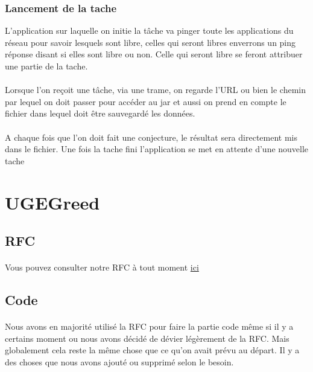 \documentclass[a4paper,titlepage]{report}
\begin{document}
\subsubsection{Lancement de la tache}
L'application sur laquelle on initie la tâche va pinger toute les applications du réseau pour savoir lesquels sont libre, celles qui seront libres enverrons un ping réponse disant si elles sont libre ou non. Celle qui seront libre se feront attribuer une partie de la tache.
\paragraph{}
Lorsque l'on reçoit une tâche, via une trame, on regarde l'URL ou bien le chemin par lequel on doit passer pour accéder au jar  et aussi on prend en compte le fichier dans lequel doit être sauvegardé les données. 
\paragraph{}
A chaque fois que l'on doit fait une conjecture, le résultat sera directement mis dans le fichier. Une fois la tache fini l'application se met en attente d'une nouvelle tache
\pagebreak







\section{UGEGreed}
\subsection{RFC}
\paragraph{}
Vous pouvez consulter notre RFC à tout moment
\href {https://gitlab.com/Setsulys/ugegreed-debats-ly-ieng/-/blob/main/GreedRfc.md}{ici}
\subsection{Code}
\paragraph{}
Nous avons en majorité utilisé la RFC pour faire la partie code même si il y a certains moment ou nous avons décidé de dévier légèrement de la RFC. Mais globalement cela reste la même chose que ce qu'on avait prévu au départ. Il y a des choses que nous avons ajouté ou supprimé selon le besoin.
\end{document}

